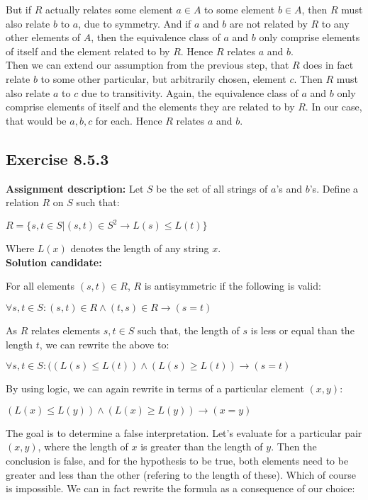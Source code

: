 \documentclass{report}
\newcommand{\cent}[1]{\begin{center}#1\end{center}}
\newcommand{\In}{\! \in \!}
\newcommand{\AssignmentDescription}{\textbf{Assignment description: }}
\newcommand{\Solution}{\textbf{Solution candidate: }}
\newcommand{\QED}{\boxed{}}
\newcommand{\Exercise}[1]{\subsection{Exercise #1}}
\begin{document}
	But if $R$ actually relates some element $a \In A$ to some element $b \In A$, then $R$ must also relate $b$ to $a$, due to symmetry. And if $a$ and $b$ are not related by $R$ to any other elements of $A$, then the equivalence class of $a$ and $b$ only comprise elements of itself and the element related to by $R$. Hence $R$ relates $a$ and $b$.\\
	
	Then we can extend our assumption from the previous step, that $R$ does in fact relate $b$ to some other particular, but arbitrarily chosen, element $c$. Then $R$ must also relate $a$ to $c$ due to transitivity. Again, the equivalence class of $a$ and $b$ only comprise elements of itself and the elements they are related to by $R$. In our case, that would be $a,b,c$ for each. Hence $R$ relates $a$ and $b$.\\
	\QED
	
	\Exercise{8.5.3}
	\AssignmentDescription
	Let $S$ be the set of all strings of $a$'s and $b$'s. Define a relation $ R $ on $ S $ such that:
	
	\cent{$ R = \{s,t \In S | (s,t) \In S^2 \to L(s) \leq L(t)\}$} 
	
	Where $L(x)$ denotes the length of any string $x$.\\
	
	\Solution
	
	For all elements $(s,t) \In R$, $R$ is antisymmetric if the following is valid:
	
	\cent{$\forall s,t \In S : (s,t) \In R \wedge (t,s) \In R \to (s = t)$}
	
	As $R$ relates elements $s,t \In S$ such that, the length of $s$ is less or equal than the length $t$, we can rewrite the above to:
	
	\cent{$\forall s,t \In S : ((L(s) \leq L(t)) \wedge (L(s) \geq L(t))\to (s = t)$}
	
	By using logic, we can again rewrite in terms of a particular element $(x,y)$: 
	
	\cent{$(L(x) \leq L(y)) \wedge (L(x) \geq L(y))\to (x = y)$}
	
	The goal is to determine a false interpretation. Let's evaluate for a particular pair $(x,y)$, where the length of $x$ is greater than the length of $y$. Then the conclusion is false, and for the hypothesis to be true, both elements need to be greater and less than the other (refering to the length of these). Which of course is impossible. We can in fact rewrite the formula as a consequence of our choice:
	
\end{document}

